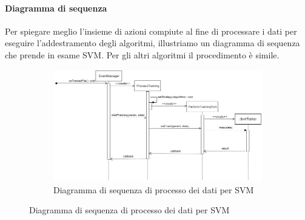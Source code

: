 		\paragraph*{Diagramma di sequenza}
		Per spiegare meglio l'insieme di azioni compiute al fine di processare i dati per eseguire l'addestramento degli algoritmi, illustriamo un diagramma di sequenza che prende in esame SVM\glo. Per gli altri algoritmi il procedimento è simile.
		\mbox{}
		\begin{landscape}
			\begin{figure}
				\begin{figure} [H]
					\includegraphics[width=\linewidth]{img/Diagrammi/ds-app.png}
					\caption{Diagramma di sequenza di processo dei dati per SVM}
				\end{figure}
			\end{figure}
		\end{landscape}
